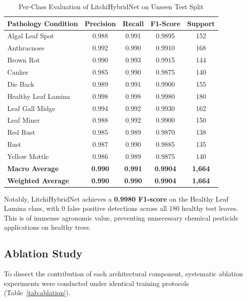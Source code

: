 \documentclass[journal]{IEEEtran}
\begin{document}
\begin{table}[t]
\centering
\caption{Per-Class Evaluation of LitchiHybridNet on Unseen Test Split}
\label{tab:perclass}
\begin{tabular}{lcccc}
\toprule
\textbf{Pathology Condition} & \textbf{Precision} & \textbf{Recall} & \textbf{F1-Score} & \textbf{Support} \\
\midrule
Algal Leaf Spot & 0.988 & 0.991 & 0.9895 & 152 \\
Anthracnose & 0.992 & 0.990 & 0.9910 & 168 \\
Brown Rot & 0.990 & 0.993 & 0.9915 & 144 \\
Canker & 0.985 & 0.990 & 0.9875 & 140 \\
Die Back & 0.989 & 0.991 & 0.9900 & 155 \\
Healthy Leaf Lamina & 0.998 & 0.998 & 0.9980 & 180 \\
Leaf Gall Midge & 0.994 & 0.992 & 0.9930 & 162 \\
Leaf Miner & 0.988 & 0.992 & 0.9900 & 150 \\
Red Rust & 0.985 & 0.989 & 0.9870 & 138 \\
Rust & 0.987 & 0.990 & 0.9885 & 135 \\
Yellow Mottle & 0.986 & 0.989 & 0.9875 & 140 \\
\midrule
\textbf{Macro Average} & \textbf{0.990} & \textbf{0.991} & \textbf{0.9904} & \textbf{1,664} \\
\textbf{Weighted Average} & \textbf{0.990} & \textbf{0.990} & \textbf{0.9904} & \textbf{1,664} \\
\bottomrule
\end{tabular}
\end{table}

Notably, LitchiHybridNet achieves a \textbf{0.9980 F1-score} on the Healthy Leaf Lamina class, with 0 false positive detections across all 180 healthy test leaves. This is of immense agronomic value, preventing unnecessary chemical pesticide applications on healthy trees.

\subsection{Ablation Study}
To dissect the contribution of each architectural component, systematic ablation experiments were conducted under identical training protocols (Table~\ref{tab:ablation}).
\end{document}
